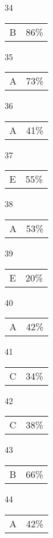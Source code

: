 \documentclass{article}
\begin{document}
\begin{multicols}{4}
\begin{enumerate}
    \item[34] \begin{tabular}{cc} B & 86\%\end{tabular}
    
    \item[35] \begin{tabular}{cc} A & 73\%\end{tabular}
    
       \item[]
    
    \item[36] \begin{tabular}{cc} A & 41\%\end{tabular}
    
    \item[37] \begin{tabular}{cc} E & 55\%\end{tabular}
    
    \item[38] \begin{tabular}{cc} A & 53\%\end{tabular}
    
    \item[39] \begin{tabular}{cc} E & 20\%\end{tabular}
    
    \item[40] \begin{tabular}{cc} A & 42\%\end{tabular}
    
       \item[]
    
    \item[41] \begin{tabular}{cc} C& 34\%\end{tabular}
    
    \item[42] \begin{tabular}{cc} C & 38\%\end{tabular}
    
    \item[43] \begin{tabular}{cc} B & 66\%\end{tabular}
    
    \item[44] \begin{tabular}{cc} A & 42\%\end{tabular}
    

\end{enumerate}
\end{multicols}
\end{document}
